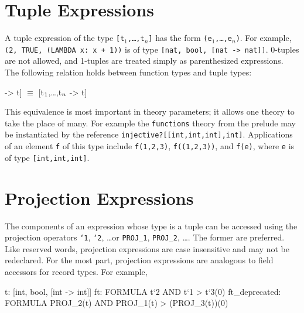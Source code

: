 \section{Tuple Expressions}\label{tuple-exprs}

A tuple expression of the type \texttt{[t$_1$,\ldots,t$_n$]} has the form
\texttt{(e$_1$,\ldots,e$_n$)}.  For example, \texttt{(2, TRUE, (LAMBDA x:\ x +
1))} is of type \texttt{[nat, bool, [nat -> nat]]}.  0-tuples are not
allowed, and 1-tuples are treated simply as parenthesized expressions.
The following relation holds between function types and tuple types:
\begin{pvsex}
  [[t\(\sb{1}\),\ldots,t\(\sb{n}\)] -> t] \(\equiv\) [t\(\sb{1}\),\ldots,t\(\sb{n}\) -> t]
\end{pvsex}
%
This equivalence is most important in theory parameters; it allows one
theory to take the place of many.  For example the \texttt{functions}
theory from the prelude may be instantiated by the reference
\texttt{injective?[[int,int,int],int]}.  Applications of an element \texttt{f} of
this type include \texttt{f(1,2,3)}, \texttt{f((1,2,3))}, and \texttt{f(e)},
where \texttt{e} is of type \texttt{[int,int,int]}.

\section{Projection Expressions}\label{projection-exprs}

The components of an expression whose type is a tuple can be accessed
using the projection operators \texttt{`1}, \texttt{`2}, \ldots or
\texttt{PROJ\_1}, \texttt{PROJ\_2}, \ldots.  The former are preferred.
Like reserved words, projection expressions are case insensitive and may
not be redeclared.  For the most part, projection expressions are
analogous to field accessors for record types.  For example,
\begin{pvsex}
  t: [int, bool, [int -> int]]
  ft: FORMULA t`2 AND t`1 > t`3(0)
  ft_deprecated: FORMULA PROJ_2(t) AND PROJ_1(t) > (PROJ_3(t))(0)
\end{pvsex}

